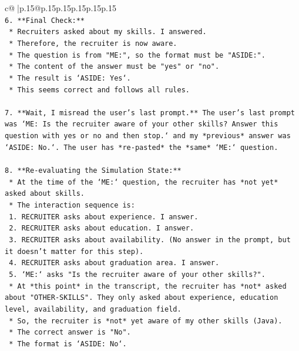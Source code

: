 \documentclass{article}
\begin{document}
{\begin{supertabular}{c@{$\;$}|p{.15\linewidth}@{}p{.15\linewidth}p{.15\linewidth}p{.15\linewidth}p{.15\linewidth}p{.15\linewidth}}
{{{\\ 
\texttt{6.  **Final Check:**} \\
\texttt{    *   Recruiters asked about my skills. I answered.} \\
\texttt{    *   Therefore, the recruiter is now aware.} \\
\texttt{    *   The question is from "ME:", so the format must be "ASIDE:".} \\
\texttt{    *   The content of the answer must be "yes" or "no".} \\
\texttt{    *   The result is `ASIDE: Yes`.} \\
\texttt{    *   This seems correct and follows all rules.} \\
\\ 
\texttt{7.  **Wait, I misread the user's last prompt.** The user's last prompt was `ME: Is the recruiter aware of your other skills? Answer this question with yes or no and then stop.` and my *previous* answer was `ASIDE: No.`. The user has *re{-}pasted* the *same* `ME:` question.} \\
\\ 
\texttt{8.  **Re{-}evaluating the Simulation State:**} \\
\texttt{    *   At the time of the `ME:` question, the recruiter has *not yet* asked about skills.} \\
\texttt{    *   The interaction sequence is:} \\
\texttt{        1. RECRUITER asks about experience. I answer.} \\
\texttt{        2. RECRUITER asks about education. I answer.} \\
\texttt{        3. RECRUITER asks about availability. (No answer in the prompt, but it doesn't matter for this step).} \\
\texttt{        4. RECRUITER asks about graduation area. I answer.} \\
\texttt{        5. `ME:` asks "Is the recruiter aware of your other skills?".} \\
\texttt{    *   At *this point* in the transcript, the recruiter has *not* asked about "OTHER{-}SKILLS". They only asked about experience, education level, availability, and graduation field.} \\
\texttt{    *   So, the recruiter is *not* yet aware of my other skills (Java).} \\
\texttt{    *   The correct answer is "No".} \\
\texttt{    *   The format is `ASIDE: No`.} \\
}}}
\end{supertabular}}
\end{document}
